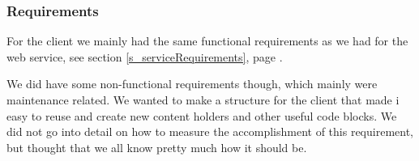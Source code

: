 \subsubsection{Requirements}
For the client we mainly had the same functional requirements as we had for the web service, see section \ref{s_serviceRequirements}, page \pageref{s_serviceRequirements}.

We did have some non-functional requirements though, which mainly were maintenance related. We wanted to make a structure for the client that made i easy to reuse and create new content holders and other useful code blocks.
We did not go into detail on how to measure the accomplishment of this requirement, but thought that we all know pretty much how it should be.